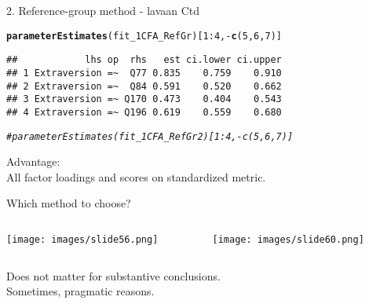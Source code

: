\documentclass[10pt]{beamer}\usepackage[]{graphicx}\usepackage[]{xcolor}
\makeatletter
\newcommand{\hlnum}[1]{\textcolor[rgb]{0.686,0.059,0.569}{#1}}%
\newcommand{\hlcom}[1]{\textcolor[rgb]{0.678,0.584,0.686}{\textit{#1}}}%
\newcommand{\hlopt}[1]{\textcolor[rgb]{0,0,0}{#1}}%
\newcommand{\hldef}[1]{\textcolor[rgb]{0.345,0.345,0.345}{#1}}%
\newcommand{\hlkwd}[1]{\textcolor[rgb]{0.737,0.353,0.396}{\textbf{#1}}}%
\newenvironment{kframe}{%
 \def\at@end@of@kframe{}%
 \ifinner\ifhmode%
  \def\at@end@of@kframe{\end{minipage}}%
  \begin{minipage}{\columnwidth}%
 \fi\fi%
 \def\FrameCommand##1{\hskip\@totalleftmargin \hskip-\fboxsep
 \colorbox{shadecolor}{##1}\hskip-\fboxsep
     \hskip-\linewidth \hskip-\@totalleftmargin \hskip\columnwidth}%
 \MakeFramed {\advance\hsize-\width
   \@totalleftmargin\z@ \linewidth\hsize
   \@setminipage}}%
 {\par\unskip\endMakeFramed%
 \at@end@of@kframe}
\newenvironment{knitrout}{}{} %
\makeatother
\begin{document}
%
\begin{frame}[fragile]{2. Reference-group method - lavaan Ctd}

\begin{knitrout}
\color{fgcolor}\begin{kframe}
\begin{alltt}
\hlkwd{parameterEstimates}\hldef{(fit_1CFA_RefGr)[}\hlnum{1}\hlopt{:}\hlnum{4}\hldef{,}\hlopt{-}\hlkwd{c}\hldef{(}\hlnum{5}\hldef{,}\hlnum{6}\hldef{,}\hlnum{7}\hldef{)]}
\end{alltt}
\begin{verbatim}
##            lhs op  rhs   est ci.lower ci.upper
## 1 Extraversion =~  Q77 0.835    0.759    0.910
## 2 Extraversion =~  Q84 0.591    0.520    0.662
## 3 Extraversion =~ Q170 0.473    0.404    0.543
## 4 Extraversion =~ Q196 0.619    0.559    0.680
\end{verbatim}
\begin{alltt}
\hlcom{#parameterEstimates(fit_1CFA_RefGr2)[1:4,-c(5,6,7)]}
\end{alltt}
\end{kframe}
\end{knitrout}

Advantage:\\ 
All factor loadings and scores on standardized metric. 

\end{frame}
%
\begin{frame}{Which method to choose?}


\begin{columns}[T] %
    \begin{column}{.49\textwidth}
    
    {}
    \texttt{[image: images/slide56.png]}
    
    \end{column}%
    
    \hfill%
    \begin{column}{.49\textwidth}
    
    {}
        \texttt{[image: images/slide60.png]}
    \end{column}%
    
    \end{columns}
    
Does not matter for substantive conclusions.\\
Sometimes, pragmatic reasons. 

\end{frame}
\end{document}
